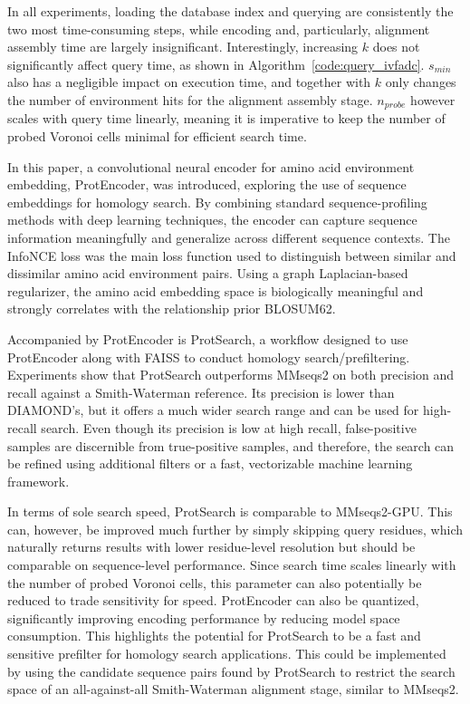 \documentclass[twoside,a4paper]{master}
\begin{document}
In all experiments, loading the database index and querying are consistently the two most time-consuming steps, while encoding and, particularly, alignment assembly time are largely insignificant. Interestingly, increasing \(k\) does not significantly affect query time, as shown in Algorithm~\ref{code:query_ivfadc}. \(s_{min}\) also has a negligible impact on execution time, and together with \(k\) only changes the number of environment hits for the alignment assembly stage. \(n_{probe}\) however scales with query time linearly, meaning it is imperative to keep the number of probed Voronoi cells minimal for efficient search time.

\label{chapter:conclusion}
In this paper, a convolutional neural encoder for amino acid environment embedding, ProtEncoder, was introduced, exploring the use of sequence embeddings for homology search. By combining standard sequence-profiling methods with deep learning techniques, the encoder can capture sequence information meaningfully and generalize across different sequence contexts. The InfoNCE loss was the main loss function used to distinguish between similar and dissimilar amino acid environment pairs. Using a graph Laplacian-based regularizer, the amino acid embedding space is biologically meaningful and strongly correlates with the relationship prior BLOSUM62.

Accompanied by ProtEncoder is ProtSearch, a workflow designed to use ProtEncoder along with FAISS to conduct homology search/prefiltering. Experiments show that ProtSearch outperforms MMseqs2 on both precision and recall against a Smith-Waterman reference. Its precision is lower than DIAMOND's, but it offers a much wider search range and can be used for high-recall search. Even though its precision is low at high recall, false-positive samples are discernible from true-positive samples, and therefore, the search can be refined using additional filters or a fast, vectorizable machine learning framework.

In terms of sole search speed, ProtSearch is comparable to MMseqs2-GPU. This can, however, be improved much further by simply skipping query residues, which naturally returns results with lower residue-level resolution but should be comparable on sequence-level performance. Since search time scales linearly with the number of probed Voronoi cells, this parameter can also potentially be reduced to trade sensitivity for speed. ProtEncoder can also be quantized, significantly improving encoding performance by reducing model space consumption. This highlights the potential for ProtSearch to be a fast and sensitive prefilter for homology search applications. This could be implemented by using the candidate sequence pairs found by ProtSearch to restrict the search space of an all-against-all Smith-Waterman alignment stage, similar to MMseqs2.
\end{document}

